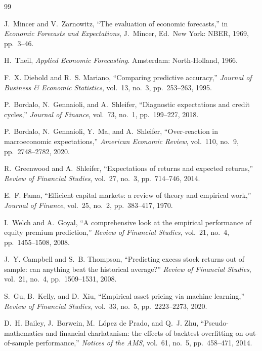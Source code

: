 \documentclass[10pt,twocolumn,twoside]{eec_style}
\begin{document}
\begin{thebibliography}{99}

 J.~Mincer and V.~Zarnowitz, ``The evaluation of economic
forecasts,'' in \emph{Economic Forecasts and Expectations}, J.~Mincer, Ed.\ New York:
NBER, 1969, pp.\ 3--46.

 H.~Theil, \emph{Applied Economic Forecasting}. Amsterdam:
North-Holland, 1966.

 F.~X. Diebold and R.~S. Mariano, ``Comparing predictive
accuracy,'' \emph{Journal of Business \& Economic Statistics}, vol.\ 13, no.\ 3,
pp.\ 253--263, 1995.

 P.~Bordalo, N.~Gennaioli, and A.~Shleifer, ``Diagnostic
expectations and credit cycles,'' \emph{Journal of Finance}, vol.\ 73, no.\ 1,
pp.\ 199--227, 2018.

 P.~Bordalo, N.~Gennaioli, Y.~Ma, and A.~Shleifer,
``Over-reaction in macroeconomic expectations,'' \emph{American Economic Review},
vol.\ 110, no.\ 9, pp.\ 2748--2782, 2020.

 R.~Greenwood and A.~Shleifer, ``Expectations of returns and
expected returns,'' \emph{Review of Financial Studies}, vol.\ 27, no.\ 3,
pp.\ 714--746, 2014.

 E.~F. Fama, ``Efficient capital markets: a review of theory and
empirical work,'' \emph{Journal of Finance}, vol.\ 25, no.\ 2, pp.\ 383--417, 1970.

 I.~Welch and A.~Goyal, ``A comprehensive look at the empirical
performance of equity premium prediction,'' \emph{Review of Financial Studies},
vol.\ 21, no.\ 4, pp.\ 1455--1508, 2008.

 J.~Y. Campbell and S.~B. Thompson, ``Predicting excess stock
returns out of sample: can anything beat the historical average?'' \emph{Review of
Financial Studies}, vol.\ 21, no.\ 4, pp.\ 1509--1531, 2008.

 S.~Gu, B.~Kelly, and D.~Xiu, ``Empirical asset pricing via machine
learning,'' \emph{Review of Financial Studies}, vol.\ 33, no.\ 5, pp.\ 2223--2273,
2020.

 D.~H. Bailey, J.~Borwein, M.~L\'opez de Prado, and Q.~J. Zhu,
``Pseudo-mathematics and financial charlatanism: the effects of backtest overfitting
on out-of-sample performance,'' \emph{Notices of the AMS}, vol.\ 61, no.\ 5,
pp.\ 458--471, 2014.


\end{thebibliography}
\end{document}
